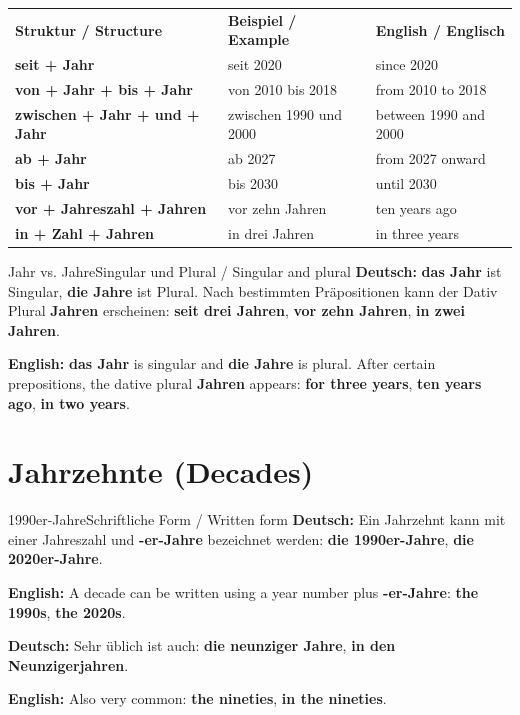 \documentclass[a4paper,11pt]{article}
\newcommand{\GermanText}[1]{\textbf{Deutsch: }#1\par}
\newcommand{\EnglishText}[1]{{\small\color{SoftGray}\textbf{English: }#1\par}}
\begin{document}
\begin{longtable}{>{\bfseries}p{3.4cm}|p{5.4cm}|p{5.4cm}}
\rowcolor{HeaderBlueDark}
\color{white}\textbf{Struktur / Structure} &
\color{white}\textbf{Beispiel / Example} &
\color{white}\textbf{English / Englisch} \\
seit + Jahr & seit 2020 & since 2020 \\
von + Jahr + bis + Jahr & von 2010 bis 2018 & from 2010 to 2018 \\
zwischen + Jahr + und + Jahr & zwischen 1990 und 2000 & between 1990 and 2000 \\
ab + Jahr & ab 2027 & from 2027 onward \\
bis + Jahr & bis 2030 & until 2030 \\
vor + Jahreszahl + Jahren & vor zehn Jahren & ten years ago \\
in + Zahl + Jahren & in drei Jahren & in three years \\
\end{longtable}

\begin{grammarentry}{Jahr vs. Jahre}{Singular und Plural / Singular and plural}
\GermanText{\textbf{das Jahr} ist Singular, \textbf{die Jahre} ist Plural. Nach bestimmten Präpositionen kann der Dativ Plural \textbf{Jahren} erscheinen: \textbf{seit drei Jahren}, \textbf{vor zehn Jahren}, \textbf{in zwei Jahren}.}
\EnglishText{\textbf{das Jahr} is singular and \textbf{die Jahre} is plural. After certain prepositions, the dative plural \textbf{Jahren} appears: \textbf{for three years}, \textbf{ten years ago}, \textbf{in two years}.}
\end{grammarentry}

\section{Jahrzehnte \textnormal{(Decades)}}

\begin{grammarentry}{1990er-Jahre}{Schriftliche Form / Written form}
\GermanText{Ein Jahrzehnt kann mit einer Jahreszahl und \textbf{-er-Jahre} bezeichnet werden: \textbf{die 1990er-Jahre}, \textbf{die 2020er-Jahre}.}
\EnglishText{A decade can be written using a year number plus \textbf{-er-Jahre}: \textbf{the 1990s}, \textbf{the 2020s}.}

\GermanText{Sehr üblich ist auch: \textbf{die neunziger Jahre}, \textbf{in den Neunzigerjahren}.}
\EnglishText{Also very common: \textbf{the nineties}, \textbf{in the nineties}.}
\end{grammarentry}
\end{document}
